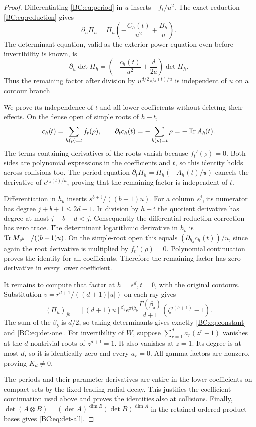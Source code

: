\begin{proof}
Differentiating \eqref{BC:eq:period} in $u$ inserts $-f_t/u^2$.
The exact reduction \eqref{BC:eq:reduction} gives
\[
 \partial_u\Pi_h=\Pi_h\left(-\frac{C_h(t)}{u^2}
                                    +\frac{B_h}u\right).
\]
The determinant equation, valid as the exterior-power equation even
before invertibility is known, is
\begin{equation}
 \partial_u\det\Pi_h=
     \left(-\frac{c_h(t)}{u^2}+\frac d{2u}\right)\det\Pi_h.
 \label{BC:eq:det-ode}
\end{equation}
Thus the remaining factor after division by $u^{d/2}e^{c_h(t)/u}$
is independent of $u$ on a contour branch.

We prove its independence of $t$ and all lower coefficients without
deleting their effects.  On the dense open of simple roots of $h-t$,
\[
 c_h(t)=\sum_{h(\rho)=t}f_t(\rho),\qquad
 \partial_t c_h(t)=-\sum_{h(\rho)=t}\rho=-\operatorname{Tr} A_h(t).
\]
The terms containing derivatives of the roots vanish because
$f_t'(\rho)=0$.  Both sides are polynomial expressions in the
coefficients and $t$, so this identity holds across collisions too.
The period equation
$\partial_t\Pi_h=\Pi_h(-A_h(t)/u)$ cancels the derivative of
$e^{c_h(t)/u}$, proving that the remaining factor is independent of $t$.

Differentiation in $h_b$ inserts $s^{b+1}/((b+1)u)$.  For a column
$s^j$, its numerator has degree $j+b+1\le2d-1$.
In division by $h-t$ the quotient derivative has degree at most
$j+b-d<j$.  Consequently the differential-reduction correction has
zero trace.  The determinant logarithmic derivative in $h_b$ is
$\operatorname{Tr} M_{s^{b+1}}/((b+1)u)$.  On the simple-root open this equals
$(\partial_{h_b}c_h(t))/u$, since again the root derivative is multiplied
by $f_t'(\rho)=0$.  Polynomial continuation proves the identity for all
coefficients.  Therefore the remaining factor has zero derivative in
every lower coefficient.

It remains to compute that factor at $h=s^d,t=0$, with the original
contours.  Substitution $v=r^{d+1}/((d+1)|u|)$ on each ray gives
\begin{equation}
 (\Pi_h)_{jb}
  =[(d+1)u]^{\beta_b}e^{\pi i\beta_b}
        \frac{\Gamma(\beta_b)}{d+1}
             (\zeta^{j(b+1)}-1).
 \label{BC:eq:gamma-columns}
\end{equation}
The sum of the $\beta_b$ is $d/2$, so taking determinants gives
exactly \eqref{BC:eq:constant} and \eqref{BC:eq:det-one}.
For invertibility of $W$, suppose
$\sum_{r=1}^d a_r(z^r-1)$ vanishes at the $d$ nontrivial roots of
$z^{d+1}=1$.  It also vanishes at $z=1$.  Its degree is at most $d$,
so it is identically zero and every $a_r=0$.  All gamma factors are
nonzero, proving $K_d\ne0$.

The periods and their parameter derivatives are entire in the lower
coefficients on compact sets by the fixed leading radial decay.
This justifies the coefficient continuation used above and proves the
identities also at collisions.  Finally,
$\det(A\otimes B)=(\det A)^{\dim B}(\det B)^{\dim A}$ in the
retained ordered product bases gives \eqref{BC:eq:det-all}.
\end{proof}

